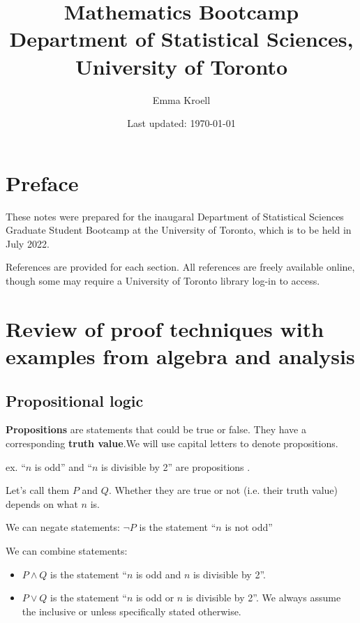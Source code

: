 \documentclass{article}
\title{Mathematics Bootcamp \\
\vspace{0.5em}
\large Department of Statistical Sciences, University of Toronto}
\author{Emma Kroell}
\date{Last updated: \today}
\begin{document}
\maketitle
\tableofcontents

\newpage
\section*{Preface}
These notes were prepared for the inaugaral Department of Statistical Sciences Graduate Student Bootcamp at the University of Toronto, which is to be held in July 2022. 

References are provided for each section. All references are freely available online, though some may require a University of Toronto library log-in to access. 

\newpage
\section{Review of proof techniques with examples from algebra and analysis}
\subsection{Propositional logic}

{\bf Propositions} are statements that could be true or false. They have a corresponding {\bf truth value}.We will use capital letters to denote propositions. 

\vspace{1em}

ex. ``$n$ is odd'' and ``$n$ is divisible by 2'' are propositions . 

Let's call them $P$ and $Q$. Whether they are true or not (i.e. their truth value) depends on what $n$ is. 

\vspace{1em}

We can  negate statements: $\neg P$ is the statement ``$n$ is not odd''

\vspace{1em}
 We can combine statements: 
 \begin{itemize}
 \item $P \wedge Q$ is the statement ``$n$ is odd and $n$ is divisible by 2''.
 \item $P \vee Q$ is the statement ``$n$ is odd or $n$ is divisible by 2''. We always assume the inclusive or unless specifically stated otherwise.
\end{itemize}
\end{document}
